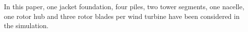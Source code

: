 

In this paper, one jacket foundation, four piles, two tower segments, one nacelle, one rotor hub and three rotor blades per wind turbine have been considered in the simulation.


